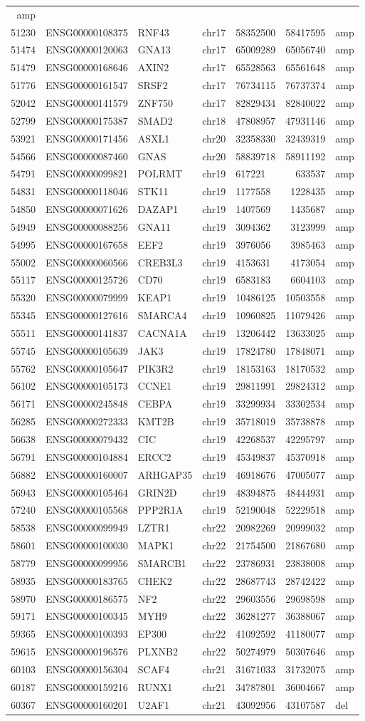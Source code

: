 \documentclass[]{article}
\begin{document}
\begin{longtable}[]{@{}rrlrlrl@{}}
amp\tabularnewline
51230 & ENSG00000108375 & RNF43 & chr17 & 58352500 & 58417595 &
amp\tabularnewline
51474 & ENSG00000120063 & GNA13 & chr17 & 65009289 & 65056740 &
amp\tabularnewline
51479 & ENSG00000168646 & AXIN2 & chr17 & 65528563 & 65561648 &
amp\tabularnewline
51776 & ENSG00000161547 & SRSF2 & chr17 & 76734115 & 76737374 &
amp\tabularnewline
52042 & ENSG00000141579 & ZNF750 & chr17 & 82829434 & 82840022 &
amp\tabularnewline
52799 & ENSG00000175387 & SMAD2 & chr18 & 47808957 & 47931146 &
amp\tabularnewline
53921 & ENSG00000171456 & ASXL1 & chr20 & 32358330 & 32439319 &
amp\tabularnewline
54566 & ENSG00000087460 & GNAS & chr20 & 58839718 & 58911192 &
amp\tabularnewline
54791 & ENSG00000099821 & POLRMT & chr19 & 617221 & 633537 &
amp\tabularnewline
54831 & ENSG00000118046 & STK11 & chr19 & 1177558 & 1228435 &
amp\tabularnewline
54850 & ENSG00000071626 & DAZAP1 & chr19 & 1407569 & 1435687 &
amp\tabularnewline
54949 & ENSG00000088256 & GNA11 & chr19 & 3094362 & 3123999 &
amp\tabularnewline
54995 & ENSG00000167658 & EEF2 & chr19 & 3976056 & 3985463 &
amp\tabularnewline
55002 & ENSG00000060566 & CREB3L3 & chr19 & 4153631 & 4173054 &
amp\tabularnewline
55117 & ENSG00000125726 & CD70 & chr19 & 6583183 & 6604103 &
amp\tabularnewline
55320 & ENSG00000079999 & KEAP1 & chr19 & 10486125 & 10503558 &
amp\tabularnewline
55345 & ENSG00000127616 & SMARCA4 & chr19 & 10960825 & 11079426 &
amp\tabularnewline
55511 & ENSG00000141837 & CACNA1A & chr19 & 13206442 & 13633025 &
amp\tabularnewline
55745 & ENSG00000105639 & JAK3 & chr19 & 17824780 & 17848071 &
amp\tabularnewline
55762 & ENSG00000105647 & PIK3R2 & chr19 & 18153163 & 18170532 &
amp\tabularnewline
56102 & ENSG00000105173 & CCNE1 & chr19 & 29811991 & 29824312 &
amp\tabularnewline
56171 & ENSG00000245848 & CEBPA & chr19 & 33299934 & 33302534 &
amp\tabularnewline
56285 & ENSG00000272333 & KMT2B & chr19 & 35718019 & 35738878 &
amp\tabularnewline
56638 & ENSG00000079432 & CIC & chr19 & 42268537 & 42295797 &
amp\tabularnewline
56791 & ENSG00000104884 & ERCC2 & chr19 & 45349837 & 45370918 &
amp\tabularnewline
56882 & ENSG00000160007 & ARHGAP35 & chr19 & 46918676 & 47005077 &
amp\tabularnewline
56943 & ENSG00000105464 & GRIN2D & chr19 & 48394875 & 48444931 &
amp\tabularnewline
57240 & ENSG00000105568 & PPP2R1A & chr19 & 52190048 & 52229518 &
amp\tabularnewline
58538 & ENSG00000099949 & LZTR1 & chr22 & 20982269 & 20999032 &
amp\tabularnewline
58601 & ENSG00000100030 & MAPK1 & chr22 & 21754500 & 21867680 &
amp\tabularnewline
58779 & ENSG00000099956 & SMARCB1 & chr22 & 23786931 & 23838008 &
amp\tabularnewline
58935 & ENSG00000183765 & CHEK2 & chr22 & 28687743 & 28742422 &
amp\tabularnewline
58970 & ENSG00000186575 & NF2 & chr22 & 29603556 & 29698598 &
amp\tabularnewline
59171 & ENSG00000100345 & MYH9 & chr22 & 36281277 & 36388067 &
amp\tabularnewline
59365 & ENSG00000100393 & EP300 & chr22 & 41092592 & 41180077 &
amp\tabularnewline
59615 & ENSG00000196576 & PLXNB2 & chr22 & 50274979 & 50307646 &
amp\tabularnewline
60103 & ENSG00000156304 & SCAF4 & chr21 & 31671033 & 31732075 &
amp\tabularnewline
60187 & ENSG00000159216 & RUNX1 & chr21 & 34787801 & 36004667 &
amp\tabularnewline
60367 & ENSG00000160201 & U2AF1 & chr21 & 43092956 & 43107587 &
del\tabularnewline
\bottomrule
\end{longtable}
\end{document}
